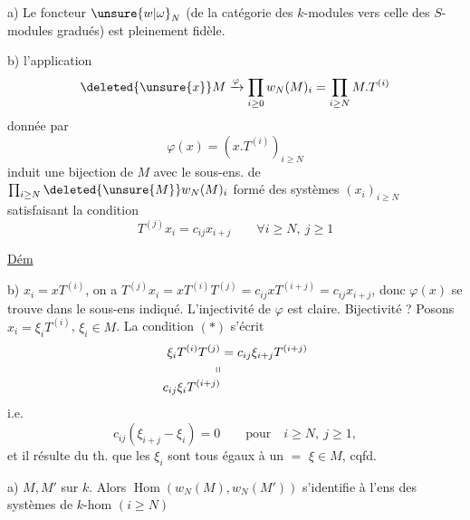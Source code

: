 a) Le foncteur $\unsure{w|\omega}_N$ (de la catégorie des $k$-modules vers celle des $S$-modules gradués) est pleinement fidèle.

b)  l'application
\[
\deleted{\unsure{x}}M\xrightarrow{\varphi}\prod_{i\geq0}w_N(M)_i=\prod_{i\geq N}M.T^{(i)}
\]
donnée par
\[
\varphi(x)=(x.T^{(i)})_{i\geq N}
\]
induit une bijection de $M$ avec le sous-ens. de $\prod_{i\geq N}\deleted{\unsure{M}}w_N(M)_i$ formé des systèmes $(x_i)_{i\geq N}$ satisfaisant la condition
\[
T^{(j)}x_i=c_{ij}x_{i+j}\qquad\forall i\geq N,\ j\geq1\tag*{$(*)$}
\]

\uline{Dém}

b) $x_i=xT^{(i)}$, on a $T^{(j)}x_i=xT^{(i)}T^{(j)}=c_{ij}xT^{(i+j)}=c_{ij}x_{i+j}$, donc $\varphi(x)$ se trouve dans le sous-ens indiqué. L'injectivité de $\varphi$ est claire. Bijectivité ? Posons $x_i=\xi_i T^{(i)}$, $\xi_i\in M$. La condition $(*)$ s'écrit
\[
\begin{aligned}
\xi_i T^{(i)}T^{(j)}&=c_{ij}\xi_{i+j}T^{(i+j)}\\[-2pt]
\shortparallel&\\[-2pt]
c_{ij}\xi_iT^{(i+j)}&
\end{aligned}
\]
i.e.
\[
c_{ij}(\xi_{i+j}-\xi_i)=0\qquad\text{pour}\quad i\geq N,\ j\geq1,
\]
et il résulte du th. que les $\xi_i$ sont tous égaux à un $=$ $\xi\in M$, cqfd.

a)  $M,M'$ sur $k$. Alors $\operatorname{Hom}(w_N(M),w_N(M'))$ s'identifie à l'ens des systèmes de $k$-hom $(i\geq N)$

